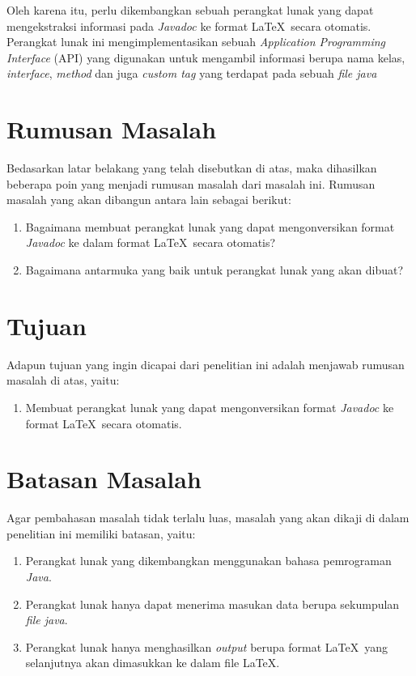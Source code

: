 Oleh karena itu, perlu dikembangkan sebuah perangkat lunak yang dapat mengekstraksi informasi pada {\it Javadoc} ke format \LaTeX\ secara otomatis. Perangkat lunak ini mengimplementasikan sebuah {\it Application Programming Interface} (API) yang digunakan untuk mengambil informasi berupa nama kelas, {\it interface}, {\it method} dan juga {\it custom tag} yang terdapat pada sebuah {\it file java}

\section{Rumusan Masalah}
\label{sec:rumusan}
Bedasarkan latar belakang yang telah disebutkan di atas, maka dihasilkan beberapa poin yang menjadi rumusan masalah dari masalah ini. Rumusan masalah yang akan dibangun antara lain sebagai berikut:
\begin{enumerate}
	\item Bagaimana membuat perangkat lunak yang dapat mengonversikan format {\it Javadoc} ke dalam format \LaTeX\ secara otomatis?
	\item Bagaimana antarmuka yang baik untuk perangkat lunak yang akan dibuat?
\end{enumerate}

\section{Tujuan}
\label{sec:tujuan}
Adapun tujuan yang ingin dicapai dari penelitian ini adalah menjawab rumusan masalah di atas, yaitu:
\begin{enumerate}
	\item Membuat perangkat lunak yang dapat mengonversikan format {\it Javadoc} ke format \LaTeX\ secara otomatis.
\end{enumerate}

\section{Batasan Masalah}
\label{sec:batasan}
Agar pembahasan masalah tidak terlalu luas, masalah yang akan dikaji di dalam penelitian ini memiliki batasan, yaitu:
\begin{enumerate}
	\item Perangkat lunak yang dikembangkan menggunakan bahasa pemrograman {\it Java}.
	\item Perangkat lunak hanya dapat menerima masukan data berupa sekumpulan {\it file java}.
	\item Perangkat lunak hanya menghasilkan {\it output } berupa format \LaTeX\ yang selanjutnya akan dimasukkan ke dalam file \LaTeX.
\end{enumerate}

